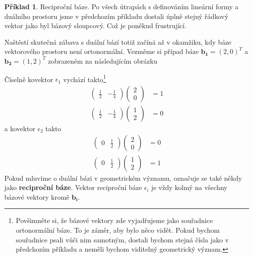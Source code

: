 \documentclass[a5paper,12pt]{amsbook}
\theoremstyle{definition}
\newtheorem{example}{Příklad}[chapter]
\newcommand{\myvec}[1]{\mathbf{#1}}
\newcommand{\mymap}[1]{#1}
\begin{document}
\begin{example}\label{example:covector2}Reciproční báze. Po všech útrapách s definováním
lineární formy a duálního prostoru jsme v předchozím příkladu dostali úplně stejný
řádkový vektor jako byl bázový sloupcový. Což je poněkud frustrující.

Naštěstí skutečná zábava s duální bází totiž začíná až v okamžiku, kdy báze vektorového prostoru
není ortonormální. Vezměme si případ báze $\myvec{b_1} = (2, 0)^T$ a $\myvec{b_2} = (1, 2)^T$
zobrazeném na následujícím obrázku
\begin{center}

\end{center}
Číselně kovektor $\mymap{\epsilon_1}$ vychází takto\footnote{
  Povšimněte si, že bázové vektory zde vyjadřujeme jako souřadnice ortonormální báze. To je záměr,
  aby bylo něco vidět. Pokud bychom souřadnice psali vůči nim samotným, dostali bychom stejná čísla
  jako v předchozím příkladu a neměli bychom viditelný geometrický význam.
}
\begin{equation*}
\begin{split}
\left(\begin{array}{cc}\frac{1}{2} & -\frac{1}{4}\end{array}\right)\left(\begin{array}{c}2\\0\end{array}\right) &= 1\\
\left(\begin{array}{cc}\frac{1}{2} & -\frac{1}{4}\end{array}\right)\left(\begin{array}{c}1\\2\end{array}\right) &= 0
\end{split}
\end{equation*}
a kovektor $\mymap{\epsilon_2}$ takto
\begin{equation*}
\begin{split}
\left(\begin{array}{cc}0 & \frac{1}{2}\end{array}\right)\left(\begin{array}{c}2\\0\end{array}\right) &= 0\\
\left(\begin{array}{cc}0 & \frac{1}{2}\end{array}\right)\left(\begin{array}{c}1\\2\end{array}\right) &= 1
\end{split}
\end{equation*}
Pokud mluvíme o duální bázi v geometrickém významu, označuje se také někdy jako \textbf{reciproční báze}.
Vektor reciproční báze $\mymap{\epsilon_i}$ je vždy kolmý na všechny bázové vektory kromě $\myvec{b_i}$.

\end{example}
\end{document}
